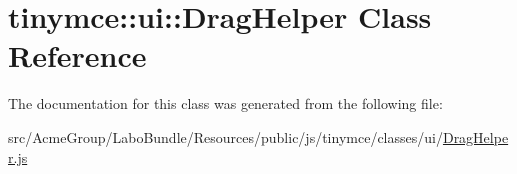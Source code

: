 \hypertarget{classtinymce_1_1ui_1_1_drag_helper}{\section{tinymce\+:\+:ui\+:\+:Drag\+Helper Class Reference}
\label{classtinymce_1_1ui_1_1_drag_helper}
}


The documentation for this class was generated from the following file\+:\begin{DoxyCompactItemize}
\item 
src/\+Acme\+Group/\+Labo\+Bundle/\+Resources/public/js/tinymce/classes/ui/\hyperlink{_drag_helper_8js}{Drag\+Helper.\+js}\end{DoxyCompactItemize}

